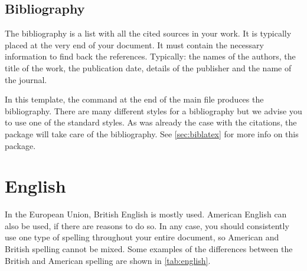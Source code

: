 \subsection{Bibliography}
The bibliography is a list with all the cited sources in your work. It is typically placed at the very end of your document. It must contain the necessary information to find back the references. Typically: the names of the authors, the title of the work, the publication date, details of the publisher and the name of the journal.

In this template, the command  at the end of the main file produces the bibliography. There are many different styles for a bibliography but we advise you to use one of the standard styles. As was already the case with the citations, the package  will take care of the bibliography. See \cref{sec:biblatex} for more info on this package.

\section{English}\label{sec:formatenglish}
In the European Union, British English is mostly used. American English can also be used, if there are reasons to do so. In any case, you should consistently use one type of spelling throughout your entire document, so American and British spelling cannot be mixed. Some examples of the differences between the British and American spelling are shown in \cref{tab:english}.

